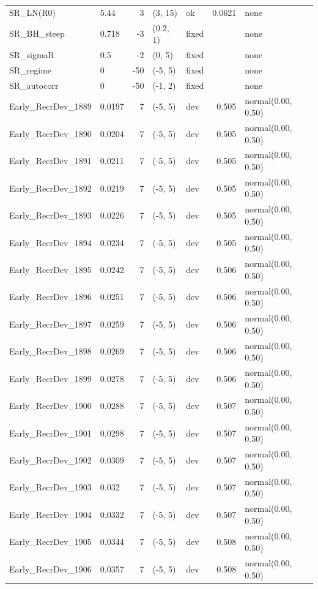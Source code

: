 \documentclass[
]{scrartcl}
\begin{document}
\begin{landscape}
\begin{longtable}{llrllrl}
SR\_LN(R0) & 5.44 & 3 & (3, 15) & ok & 0.0621 & none \\ 
SR\_BH\_steep & 0.718 & -3 & (0.2, 1) & fixed &  & none \\ 
SR\_sigmaR & 0.5 & -2 & (0, 5) & fixed &  & none \\ 
SR\_regime & 0 & -50 & (-5, 5) & fixed &  & none \\ 
SR\_autocorr & 0 & -50 & (-1, 2) & fixed &  & none \\ 
Early\_RecrDev\_1889 & 0.0197 & 7 & (-5, 5) & dev & 0.505 & normal(0.00, 0.50) \\ 
Early\_RecrDev\_1890 & 0.0204 & 7 & (-5, 5) & dev & 0.505 & normal(0.00, 0.50) \\ 
Early\_RecrDev\_1891 & 0.0211 & 7 & (-5, 5) & dev & 0.505 & normal(0.00, 0.50) \\ 
Early\_RecrDev\_1892 & 0.0219 & 7 & (-5, 5) & dev & 0.505 & normal(0.00, 0.50) \\ 
Early\_RecrDev\_1893 & 0.0226 & 7 & (-5, 5) & dev & 0.505 & normal(0.00, 0.50) \\ 
Early\_RecrDev\_1894 & 0.0234 & 7 & (-5, 5) & dev & 0.505 & normal(0.00, 0.50) \\ 
Early\_RecrDev\_1895 & 0.0242 & 7 & (-5, 5) & dev & 0.506 & normal(0.00, 0.50) \\ 
Early\_RecrDev\_1896 & 0.0251 & 7 & (-5, 5) & dev & 0.506 & normal(0.00, 0.50) \\ 
Early\_RecrDev\_1897 & 0.0259 & 7 & (-5, 5) & dev & 0.506 & normal(0.00, 0.50) \\ 
Early\_RecrDev\_1898 & 0.0269 & 7 & (-5, 5) & dev & 0.506 & normal(0.00, 0.50) \\ 
Early\_RecrDev\_1899 & 0.0278 & 7 & (-5, 5) & dev & 0.506 & normal(0.00, 0.50) \\ 
Early\_RecrDev\_1900 & 0.0288 & 7 & (-5, 5) & dev & 0.507 & normal(0.00, 0.50) \\ 
Early\_RecrDev\_1901 & 0.0298 & 7 & (-5, 5) & dev & 0.507 & normal(0.00, 0.50) \\ 
Early\_RecrDev\_1902 & 0.0309 & 7 & (-5, 5) & dev & 0.507 & normal(0.00, 0.50) \\ 
Early\_RecrDev\_1903 & 0.032 & 7 & (-5, 5) & dev & 0.507 & normal(0.00, 0.50) \\ 
Early\_RecrDev\_1904 & 0.0332 & 7 & (-5, 5) & dev & 0.507 & normal(0.00, 0.50) \\ 
Early\_RecrDev\_1905 & 0.0344 & 7 & (-5, 5) & dev & 0.508 & normal(0.00, 0.50) \\ 
Early\_RecrDev\_1906 & 0.0357 & 7 & (-5, 5) & dev & 0.508 & normal(0.00, 0.50) \\ 

\end{longtable}
\end{landscape}
\end{document}
